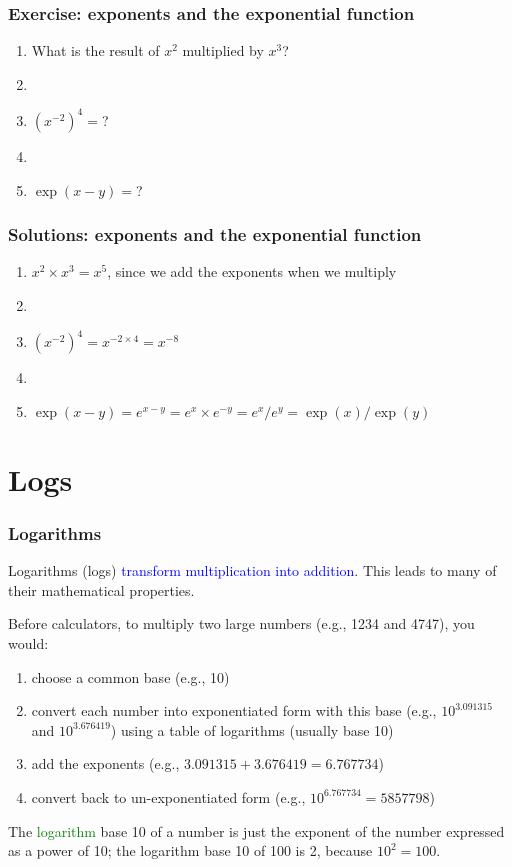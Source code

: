 \documentclass[11pt]{beamer}
\newcommand{\myframe}[1]{\begin{frame} \frametitle{#1}}
\begin{document}
\myframe{Exercise: exponents and the exponential function}
\begin{enumerate}
\item What is the result of $x^2$ multiplied by $x^3$?
\item[]
\item $(x^{-2})^4 = $?
\item[]
\item $\exp(x - y) = $?
\end{enumerate}
\end{frame}

\myframe{Solutions: exponents and the exponential function}
\begin{enumerate}
\item $x^2 \times x^3 = x^5$, since we add the exponents when we multiply
\item[]
\item $(x^{-2})^4 = x^{-2 \times 4} = x^{-8}$
\item[]
\item $\exp(x - y) = e^{x - y} = e^x \times e^{-y} = e^x/e^y = \exp(x)/\exp(y)$
\end{enumerate}
\end{frame}

\section{Logs}
\myframe{Logarithms}
Logarithms (logs) \textcolor{blue}{transform multiplication into addition}. This leads to many of their mathematical properties. 

Before calculators, to multiply two large numbers (e.g., 1234 and 4747), you would:
{\fontsize{10pt}{7.2}\selectfont
\begin{enumerate}
\item choose a common base (e.g., 10)
\item convert each number into exponentiated form with this base (e.g., $10^{3.091315}$ and $10^{3.676419}$) using a table of logarithms (usually base 10)
\item add the exponents (e.g., $3.091315 + 3.676419 = 6.767734$)
\item convert back to un-exponentiated form (e.g., $10^{6.767734} = 5857798$)
\end{enumerate}
}

The \textcolor{green}{logarithm} base 10 of a number is just the exponent of the number expressed as a power of 10; the logarithm base 10 of 100 is 2, because $10^2 = 100$.
\end{frame}
\end{document}
